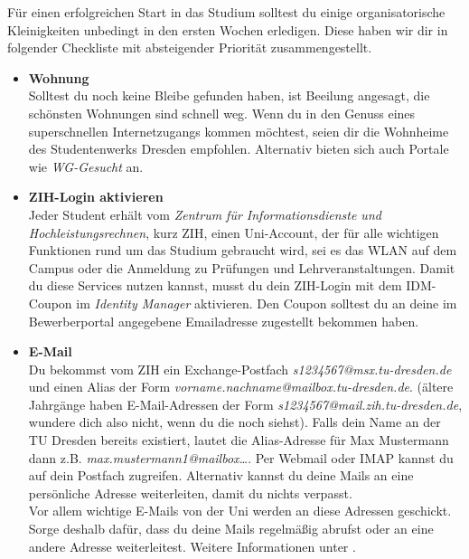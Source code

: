 \newcommand{\checkbox}[1]{\item[$\square$]\textbf{#1}\\}


Für einen erfolgreichen Start in das Studium solltest du einige organisatorische Kleinigkeiten unbedingt in den ersten Wochen erledigen.
Diese haben wir dir in folgender Checkliste mit absteigender Priorität zusammengestellt.

\begin{itemize}[leftmargin=*]

\checkbox{Wohnung}
Solltest du noch keine Bleibe gefunden haben, ist Beeilung angesagt, die schönsten Wohnungen sind schnell weg.
Wenn du in den Genuss eines superschnellen Internetzugangs kommen möchtest, seien dir die Wohnheime  des Studentenwerks Dresden empfohlen. Alternativ bieten sich auch Portale wie \textit{WG-Gesucht}  an.

\checkbox{ZIH-Login aktivieren}
Jeder Student erhält vom \textit{Zentrum für Informationsdienste und Hochleistungsrechnen}, kurz ZIH, einen Uni-Account, der für alle wichtigen Funktionen rund um das Studium gebraucht wird, sei es das WLAN auf dem Campus oder die Anmeldung zu Prüfungen und Lehrveranstaltungen.
Damit du diese Services nutzen kannst, musst du dein ZIH-Login mit dem IDM-Coupon im \textit{Identity Manager}  aktivieren. Den Coupon solltest du an deine im Bewerberportal angegebene Emailadresse zugestellt bekommen haben.


\checkbox{E-Mail}
Du bekommst vom ZIH ein Exchange-Postfach \textit{s1234567@msx.tu-dresden.de} und einen Alias der Form \textit{vorname.nachname@mailbox.tu-dresden.de}.
		(ältere Jahrgänge haben E-Mail-Adressen der Form \textit{s1234567\allowbreak{}@mail.zih.tu-dresden.de}, wundere dich also nicht, wenn du die noch siehst).
Falls dein Name an der TU Dresden bereits existiert, lautet die Alias-Adresse für Max Mustermann dann z.B. \textit{max.mustermann1@mailbox…}.
Per Webmail oder IMAP kannst du auf dein Postfach zugreifen.
Alternativ kannst du deine Mails an eine persönliche Adresse weiterleiten, damit du nichts verpasst. \\
Vor allem wichtige E-Mails von der Uni werden an diese Adressen geschickt. Sorge deshalb dafür, dass du deine Mails regelmäßig abrufst oder an eine andere Adresse weiterleitest. Weitere Informationen unter .


\end{itemize}
